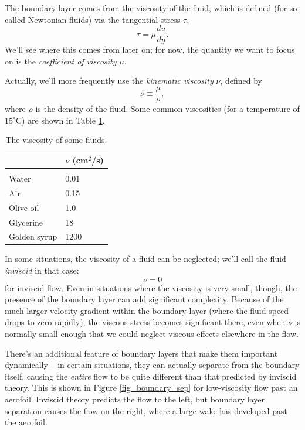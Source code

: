 The boundary layer comes from the viscosity of the fluid, which is defined (for so-called Newtonian fluids) via the tangential stress $\tau$,
\begin{equation}
\label{eq_visc_def}
\tau = \mu \frac{du}{dy}.
\end{equation}
We'll see where this comes from later on; for now, the quantity we want to focus on is the \emph{coefficient of viscosity} $\mu$.

Actually, we'll more frequently use the \emph{kinematic viscosity} $\nu$, defined by
$$
\nu \equiv \frac{\mu}{\rho},
$$
where $\rho$ is the density of the fluid. Some common viscosities (for a temperature of $15^\circ$C) are shown in Table \ref{tab_viscosity}.

\begin{table}[t]
\centering
  \begin{tabular}{l|l}
  & $\nu$ (cm$^2$/s) \\
  \hline \\
  Water & 0.01 \\
  Air & 0.15 \\
  Olive oil & 1.0 \\
  Glycerine & 18 \\
  Golden syrup & 1200
  \end{tabular}
  \caption{The viscosity of some fluids.}
  \label{tab_viscosity}
\end{table}

In some situations, the viscosity of a fluid can be neglected; we'll call the fluid \emph{inviscid} in that case:
\begin{equation}
\boxed{
\nu = 0
}
\end{equation}
for inviscid flow.  Even in situations where the viscosity is very small, though, the presence of the boundary layer can add significant complexity.  Because of the much larger velocity gradient within the boundary layer (where the fluid speed drops to zero  rapidly), the viscous stress becomes significant there, even when $\nu$ is normally small enough that we could neglect viscous effects elsewhere in the flow.

There's an additional feature of boundary layers that make them important dynamically -- in certain situations, they can actually separate from the boundary itself, causing the \emph{entire} flow to be quite different than that predicted by inviscid theory.  This is shown in Figure \ref{fig_boundary_sep} for low-viscosity flow past an aerofoil.  Inviscid theory predicts the flow to the left, but boundary layer separation causes the flow on the right, where a large wake has developed past the aerofoil.

